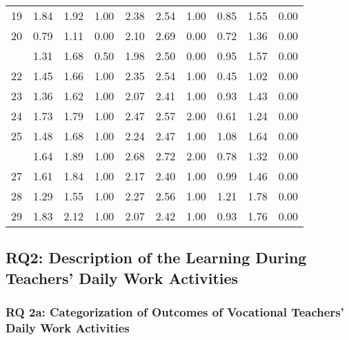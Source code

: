 \documentclass[
]{article}
\begin{document}
\begin{longtable}[t]{lccccccccc}
19 & 1.84 & 1.92 & 1.00 & 2.38 & 2.54 & 1.00 & 0.85 & 1.55 & 0.00\\
20 & 0.79 & 1.11 & 0.00 & 2.10 & 2.69 & 0.00 & 0.72 & 1.36 & 0.00\\
\addlinespace
21 & 1.31 & 1.68 & 0.50 & 1.98 & 2.50 & 0.00 & 0.95 & 1.57 & 0.00\\
22 & 1.45 & 1.66 & 1.00 & 2.35 & 2.54 & 1.00 & 0.45 & 1.02 & 0.00\\
23 & 1.36 & 1.62 & 1.00 & 2.07 & 2.41 & 1.00 & 0.93 & 1.43 & 0.00\\
24 & 1.73 & 1.79 & 1.00 & 2.47 & 2.57 & 2.00 & 0.61 & 1.24 & 0.00\\
25 & 1.48 & 1.68 & 1.00 & 2.24 & 2.47 & 1.00 & 1.08 & 1.64 & 0.00\\
\addlinespace
26 & 1.64 & 1.89 & 1.00 & 2.68 & 2.72 & 2.00 & 0.78 & 1.32 & 0.00\\
27 & 1.61 & 1.84 & 1.00 & 2.17 & 2.40 & 1.00 & 0.99 & 1.46 & 0.00\\
28 & 1.29 & 1.55 & 1.00 & 2.27 & 2.56 & 1.00 & 1.21 & 1.78 & 0.00\\
29 & 1.83 & 2.12 & 1.00 & 2.07 & 2.42 & 1.00 & 0.93 & 1.76 & 0.00\\
\bottomrule
\end{longtable}
\endgroup{}

\subsection{RQ2: Description of the Learning During Teachers' Daily Work
Activities}\label{rq2-description-of-the-learning-during-teachers-daily-work-activities}

\subsubsection{RQ 2a: Categorization of Outcomes of Vocational Teachers'
Daily Work
Activities}\label{rq-2a-categorization-of-outcomes-of-vocational-teachers-daily-work-activities}
\end{document}
